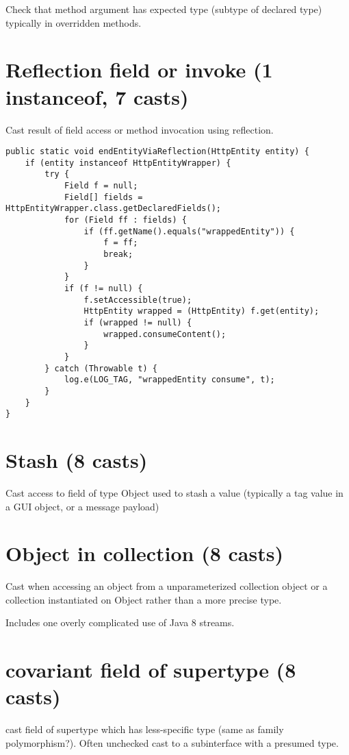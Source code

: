 \documentclass{usiinfdocprop}
\begin{document}
Check that method argument has expected type (subtype of declared type) typically in overridden methods. 

\section{Reflection field or invoke (1 instanceof, 7 casts)}
\label{sec:orge17c719}

Cast result of field access or method invocation using reflection. 

\lstset{language=java,label= ,caption= ,captionpos=b,numbers=none}
\begin{lstlisting}
public static void endEntityViaReflection(HttpEntity entity) { 
    if (entity instanceof HttpEntityWrapper) { 
        try { 
            Field f = null; 
            Field[] fields = HttpEntityWrapper.class.getDeclaredFields(); 
            for (Field ff : fields) { 
                if (ff.getName().equals("wrappedEntity")) { 
                    f = ff; 
                    break; 
                } 
            } 
            if (f != null) { 
                f.setAccessible(true); 
                HttpEntity wrapped = (HttpEntity) f.get(entity); 
                if (wrapped != null) { 
                    wrapped.consumeContent(); 
                } 
            } 
        } catch (Throwable t) { 
            log.e(LOG_TAG, "wrappedEntity consume", t); 
        } 
    } 
} 
\end{lstlisting}
\section{Stash (8 casts)}
\label{sec:orge078c3e}

Cast access to field of type Object used to stash a value (typically a tag value in a GUI object, or a message payload) 

\section{Object in collection (8 casts)}
\label{sec:org46d12bb}
Cast when accessing an object from a unparameterized collection object or a collection instantiated on Object rather than a more precise type. 

Includes one overly complicated use of Java 8 streams. 

\section{covariant field of supertype (8 casts)}
\label{sec:org04791cf}
cast field of supertype which has less-specific type (same as family polymorphism?). 
Often unchecked cast to a subinterface with a presumed type. 
\end{document}
